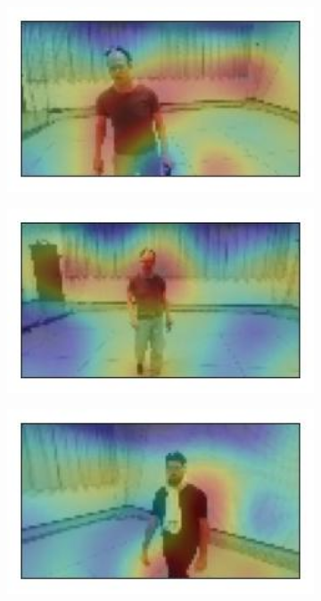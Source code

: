 \begin{figure}[!h]
	\begin{center}
		\begin{subfigure}[h]{0.24\textwidth}
			\centering
			\includegraphics[width=1\textwidth]{"contents/images/gradcam/gradcam-curtains-1"}
		\end{subfigure}
		\hfill
		\begin{subfigure}[h]{0.24\textwidth}
			\centering
			\includegraphics[width=1\textwidth]{"contents/images/gradcam/gradcam-curtains-2"}
		\end{subfigure}
		\hfill
		\begin{subfigure}[h]{0.24\textwidth}
			\centering
			\includegraphics[width=1\textwidth]{"contents/images/gradcam/gradcam-curtains-3"}

\end{subfigure}
\end{center}
\end{figure}
